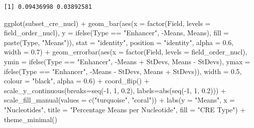 \documentclass[
  letterpaper,
  DIV=11,
  numbers=noendperiod]{scrartcl}
\newenvironment{Shaded}{\begin{snugshade}}{\end{snugshade}}
\newcommand{\AttributeTok}[1]{\textcolor[rgb]{0.40,0.45,0.13}{#1}}
\newcommand{\DecValTok}[1]{\textcolor[rgb]{0.68,0.00,0.00}{#1}}
\newcommand{\FloatTok}[1]{\textcolor[rgb]{0.68,0.00,0.00}{#1}}
\newcommand{\FunctionTok}[1]{\textcolor[rgb]{0.28,0.35,0.67}{#1}}
\newcommand{\NormalTok}[1]{\textcolor[rgb]{0.00,0.23,0.31}{#1}}
\newcommand{\SpecialCharTok}[1]{\textcolor[rgb]{0.37,0.37,0.37}{#1}}
\newcommand{\StringTok}[1]{\textcolor[rgb]{0.13,0.47,0.30}{#1}}
\begin{document}
\begin{verbatim}
[1] 0.09436998 0.03892581
\end{verbatim}

\begin{Shaded}
\begin{Highlighting}[]
\FunctionTok{ggplot}\NormalTok{(subset\_cre\_nucl) }\SpecialCharTok{+}
  \FunctionTok{geom\_bar}\NormalTok{(}\FunctionTok{aes}\NormalTok{(}\AttributeTok{x =} \FunctionTok{factor}\NormalTok{(Field, }\AttributeTok{levels =}\NormalTok{ field\_order\_nucl), }
               \AttributeTok{y =} \FunctionTok{ifelse}\NormalTok{(Type }\SpecialCharTok{==} \StringTok{"Enhancer"}\NormalTok{, }\SpecialCharTok{{-}}\NormalTok{Means, Means), }
               \AttributeTok{fill =} \FunctionTok{paste}\NormalTok{(Type, }\StringTok{"Means"}\NormalTok{)),}
           \AttributeTok{stat =} \StringTok{"identity"}\NormalTok{, }\AttributeTok{position =} \StringTok{"identity"}\NormalTok{, }
           \AttributeTok{alpha =} \FloatTok{0.6}\NormalTok{, }\AttributeTok{width =} \FloatTok{0.7}\NormalTok{) }\SpecialCharTok{+}
  \FunctionTok{geom\_errorbar}\NormalTok{(}\FunctionTok{aes}\NormalTok{(}\AttributeTok{x =} \FunctionTok{factor}\NormalTok{(Field, }\AttributeTok{levels =}\NormalTok{ field\_order\_nucl),}
                    \AttributeTok{ymin =} \FunctionTok{ifelse}\NormalTok{(Type }\SpecialCharTok{==} \StringTok{"Enhancer"}\NormalTok{,}
                                  \SpecialCharTok{{-}}\NormalTok{Means }\SpecialCharTok{+}\NormalTok{ StDevs, Means }\SpecialCharTok{{-}}\NormalTok{ StDevs),}
                    \AttributeTok{ymax =} \FunctionTok{ifelse}\NormalTok{(Type }\SpecialCharTok{==} \StringTok{"Enhancer"}\NormalTok{,}
                                  \SpecialCharTok{{-}}\NormalTok{Means }\SpecialCharTok{{-}}\NormalTok{ StDevs, Means }\SpecialCharTok{+}\NormalTok{ StDevs)),}
                \AttributeTok{width =} \FloatTok{0.5}\NormalTok{, }\AttributeTok{colour =} \StringTok{"black"}\NormalTok{, }\AttributeTok{alpha =} \FloatTok{0.6}\NormalTok{) }\SpecialCharTok{+}
  \FunctionTok{coord\_flip}\NormalTok{() }\SpecialCharTok{+}
  \FunctionTok{scale\_y\_continuous}\NormalTok{(}\AttributeTok{breaks=}\FunctionTok{seq}\NormalTok{(}\SpecialCharTok{{-}}\DecValTok{1}\NormalTok{, }\DecValTok{1}\NormalTok{, }\FloatTok{0.2}\NormalTok{), }\AttributeTok{labels=}\FunctionTok{abs}\NormalTok{(}\FunctionTok{seq}\NormalTok{(}\SpecialCharTok{{-}}\DecValTok{1}\NormalTok{, }\DecValTok{1}\NormalTok{, }\FloatTok{0.2}\NormalTok{))) }\SpecialCharTok{+}
  \FunctionTok{scale\_fill\_manual}\NormalTok{(}\AttributeTok{values =} \FunctionTok{c}\NormalTok{(}\StringTok{"turquoise"}\NormalTok{, }\StringTok{"coral"}\NormalTok{)) }\SpecialCharTok{+}
  \FunctionTok{labs}\NormalTok{(}\AttributeTok{y =} \StringTok{"Means"}\NormalTok{, }\AttributeTok{x =} \StringTok{"Nucleotides"}\NormalTok{, }
       \AttributeTok{title =} \StringTok{"Percentage Means per Nucleotide"}\NormalTok{, }
       \AttributeTok{fill =} \StringTok{"CRE Type"}\NormalTok{) }\SpecialCharTok{+}
  \FunctionTok{theme\_minimal}\NormalTok{()}
\end{Highlighting}
\end{Shaded}
\end{document}
